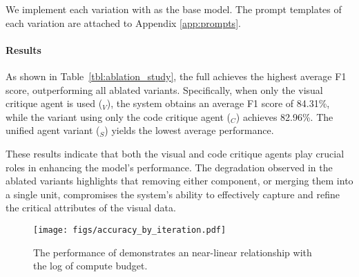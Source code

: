 We implement each variation with \gpt as the base model. The prompt templates of each variation are attached to Appendix \ref{app:prompts}.

\paragraph{Results}

As shown in Table~\ref{tbl:ablation_study}, the full \model{} achieves the highest average F1 score, outperforming all ablated variants. Specifically, when only the visual critique agent is used (\model{}$_V$), the system obtains an average F1 score of 84.31\%, while the variant using only the code critique agent (\model{}$_C$) achieves 82.96\%. The unified agent variant (\model{}$_S$) yields the lowest average performance. 

These results indicate that both the visual and code critique agents play crucial roles in enhancing the model’s performance. The degradation observed in the ablated variants highlights that removing either component, or merging them into a single unit, compromises the system’s ability to effectively capture and refine the critical attributes of the visual data.


\begin{figure*}[ht]
    \centering
    \texttt{[image: figs/accuracy\_by\_iteration.pdf]}
    \caption{The performance of \model{} demonstrates an near-linear relationship with the log of compute budget.}
    \vspace{-0.1in}
    \label{fig:acc_by_iter}
\end{figure*}



